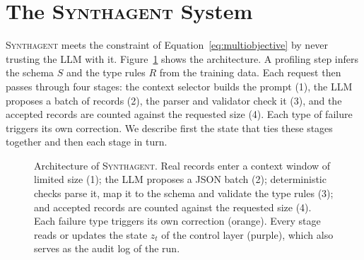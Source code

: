 \documentclass[conference]{IEEEtran}
\newcommand{\system}{\textsc{Synthagent}\xspace}
\begin{document}
\section{The \system System}
\label{sec:system}
\system meets the constraint of Equation~\eqref{eq:multiobjective} by never trusting the LLM with it. Figure~\ref{fig:architecture} shows the architecture. A profiling step infers the schema $S$ and the type rules $R$ from the training data. Each request then passes through four stages: the context selector builds the prompt (1), the LLM proposes a batch of records (2), the parser and validator check it (3), and the accepted records are counted against the requested size (4). Each type of failure triggers its own correction. We describe first the state that ties these stages together and then each stage in turn.

\begin{figure}[t]
\centering
\resizebox{\textwidth}{!}{}
\caption{Architecture of \system. Real records enter a context window of limited size (1); the LLM proposes a JSON batch (2); deterministic checks parse it, map it to the schema and validate the type rules (3); and accepted records are counted against the requested size (4). Each failure type triggers its own correction (orange). Every stage reads or updates the state $z_t$ of the control layer (purple), which also serves as the audit log of the run.}
\label{fig:architecture}
\end{figure}
\end{document}
